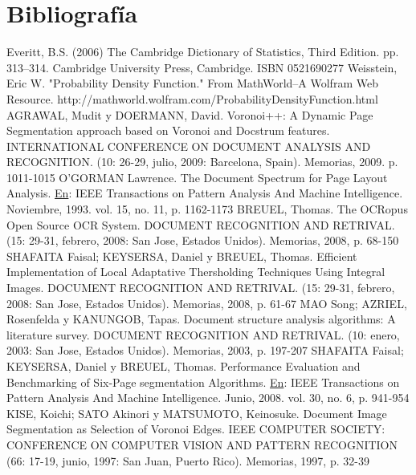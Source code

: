 \documentclass[a4paper, 11pt, oneside]{report}
\begin{document}

\chapter*{Bibliografía}
Everitt, B.S. (2006) The Cambridge Dictionary of Statistics, Third Edition. pp. 313–314. Cambridge University Press, Cambridge. ISBN 0521690277
Weisstein, Eric W. "Probability Density Function." From MathWorld--A Wolfram Web Resource. http://mathworld.wolfram.com/ProbabilityDensityFunction.html
AGRAWAL, Mudit y DOERMANN, David. Voronoi++: A Dynamic Page Segmentation approach based on Voronoi and Docstrum features. INTERNATIONAL CONFERENCE ON DOCUMENT ANALYSIS AND RECOGNITION. (10: 26-29, julio, 2009: Barcelona, Spain). Memorias, 2009. p. 1011-1015
O'GORMAN Lawrence. The Document Spectrum for Page Layout Analysis. \underline{En}: IEEE Transactions on Pattern Analysis And Machine Intelligence. Noviembre, 1993. vol. 15, no. 11, p. 1162-1173
BREUEL, Thomas. The OCRopus Open Source OCR System. DOCUMENT RECOGNITION AND RETRIVAL. (15: 29-31, febrero, 2008: San Jose, Estados Unidos). Memorias, 2008, p. 68-150
SHAFAITA Faisal; KEYSERSA, Daniel y BREUEL, Thomas. Efficient Implementation of Local Adaptative Thersholding Techniques Using Integral Images. DOCUMENT RECOGNITION AND RETRIVAL. (15: 29-31, febrero, 2008: San Jose, Estados Unidos). Memorias, 2008, p. 61-67
MAO Song; AZRIEL, Rosenfelda y KANUNGOB, Tapas. Document structure analysis algorithms: A literature survey. DOCUMENT RECOGNITION AND RETRIVAL. (10: enero, 2003: San Jose, Estados Unidos). Memorias, 2003, p. 197-207
SHAFAITA Faisal; KEYSERSA, Daniel y BREUEL, Thomas. Performance Evaluation and Benchmarking of Six-Page segmentation Algorithms. \underline{En}: IEEE Transactions on Pattern Analysis And Machine Intelligence. Junio, 2008. vol. 30, no. 6, p. 941-954
KISE, Koichi; SATO Akinori y MATSUMOTO, Keinosuke. Document Image Segmentation as Selection of Voronoi Edges. IEEE COMPUTER SOCIETY: CONFERENCE ON COMPUTER VISION AND PATTERN RECOGNITION (66: 17-19, junio, 1997: San Juan, Puerto Rico). Memorias, 1997, p. 32-39
\end{document}
